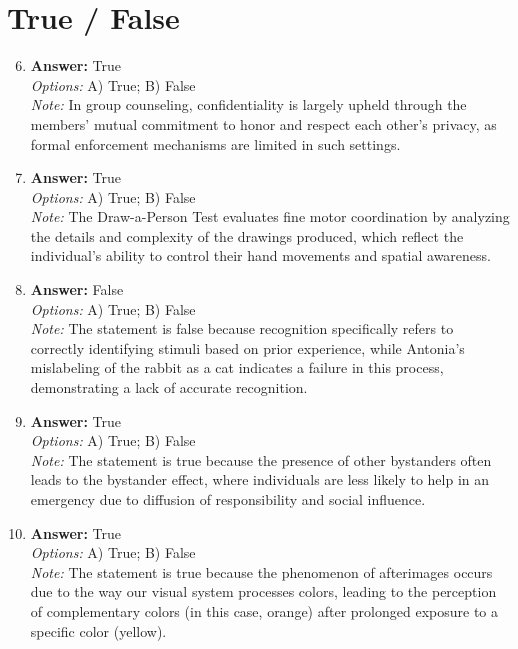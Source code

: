 \documentclass[12pt]{article}
\begin{document}
\section*{True / False}
\begin{enumerate}[label=\arabic*.]
\setcounter{enumi}{5}
\item \textbf{Answer:} True
\\ \textit{Options:} A) True; B) False
\\ \textit{Note:} In group counseling, confidentiality is largely upheld through the members' mutual commitment to honor and respect each other's privacy, as formal enforcement mechanisms are limited in such settings.
\item \textbf{Answer:} True
\\ \textit{Options:} A) True; B) False
\\ \textit{Note:} The Draw-a-Person Test evaluates fine motor coordination by analyzing the details and complexity of the drawings produced, which reflect the individual's ability to control their hand movements and spatial awareness.
\item \textbf{Answer:} False
\\ \textit{Options:} A) True; B) False
\\ \textit{Note:} The statement is false because recognition specifically refers to correctly identifying stimuli based on prior experience, while Antonia's mislabeling of the rabbit as a cat indicates a failure in this process, demonstrating a lack of accurate recognition.
\item \textbf{Answer:} True
\\ \textit{Options:} A) True; B) False
\\ \textit{Note:} The statement is true because the presence of other bystanders often leads to the bystander effect, where individuals are less likely to help in an emergency due to diffusion of responsibility and social influence.
\item \textbf{Answer:} True
\\ \textit{Options:} A) True; B) False
\\ \textit{Note:} The statement is true because the phenomenon of afterimages occurs due to the way our visual system processes colors, leading to the perception of complementary colors (in this case, orange) after prolonged exposure to a specific color (yellow).
\end{enumerate}
\end{document}
